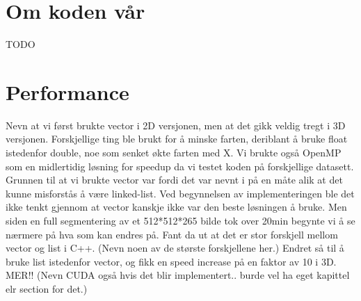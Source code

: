 \section{Om koden vår}
TODO

\section{Performance}
Nevn at vi først brukte vector i 2D versjonen, men at det gikk veldig tregt i 3D versjonen. Forskjellige ting ble brukt for å minske farten, deriblant å bruke float istedenfor double, noe som senket økte farten med X. Vi brukte også OpenMP som en midlertidig løsning for speedup da vi testet koden på forskjellige datasett. Grunnen til at vi brukte vector var fordi det var nevnt i \cite{lankton09} på en måte alik at det kunne misforstås å være linked-list. Ved begynnelsen av implementeringen ble det ikke tenkt gjennom at vector kanskje ikke var den beste løsningen å bruke. Men siden en full segmentering av et 512*512*265 bilde tok over 20min begynte vi å se nærmere på hva som kan endres på. Fant da ut at det er stor forskjell mellom vector og list i C++. (Nevn noen av de største forskjellene her.) Endret så til å bruke list istedenfor vector, og fikk en speed increase på en faktor av 10 i 3D. MER!! (Nevn CUDA også hvis det blir implementert.. burde vel ha eget kapittel elr section for det.) 

